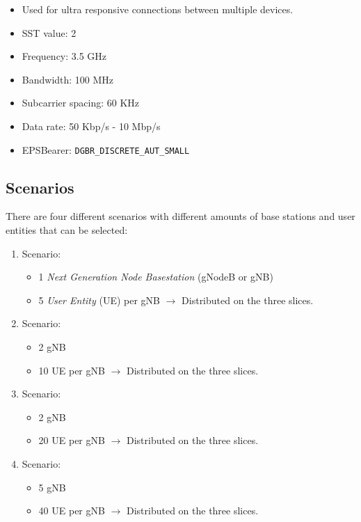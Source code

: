 \begin{itemize}
        \begin{itemize}
            \item Used for ultra responsive connections between multiple devices.
            \item SST value: 2
            \item Frequency: 3.5 GHz
            \item Bandwidth: 100 MHz
            \item Subcarrier spacing: 60 KHz
            \item Data rate: 50 Kbp/s - 10 Mbp/s
            \item EPSBearer: \verb!DGBR_DISCRETE_AUT_SMALL!
        \end{itemize}
    \end{itemize}
    
    \subsection{Scenarios}
    There are four different scenarios with different amounts of base stations and user entities that can be selected:
    \begin{enumerate}
        \item Scenario:
            \begin{itemize}
                \item 1 \textit{Next Generation Node Basestation} (gNodeB or gNB)
                \item 5 \textit{User Entity} (UE) per gNB $\rightarrow{}$ Distributed on the three slices.
            \end{itemize}
        \item Scenario:
        \begin{itemize}
            \item 2 gNB
            \item 10 UE per gNB $\rightarrow{}$ Distributed on the three slices.
        \end{itemize}
        \item Scenario:
        \begin{itemize}
            \item 2 gNB
	        \item 20 UE per gNB $\rightarrow{}$ Distributed on the three slices.
        \end{itemize}
        \item Scenario:
        \begin{itemize}
            \item 5 gNB
            \item 40 UE per gNB $\rightarrow{}$ Distributed on the three slices.
        \end{itemize}
    \end{enumerate}
    
